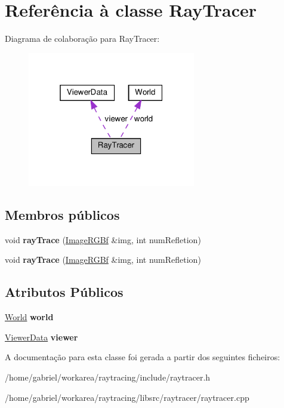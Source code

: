 \hypertarget{classRayTracer}{}\section{Referência à classe Ray\+Tracer}
\label{classRayTracer}


Diagrama de colaboração para Ray\+Tracer\+:
\nopagebreak
\begin{figure}[H]
\begin{center}
\leavevmode
\includegraphics[width=208pt]{classRayTracer__coll__graph}
\end{center}
\end{figure}
\subsection*{Membros públicos}
\begin{DoxyCompactItemize}
\item 
\mbox{\label{classRayTracer_aa4df800980bc0031eb6d15cf805feee9}} 
void {\bfseries ray\+Trace} (\hyperlink{classImageRGBf}{Image\+R\+G\+Bf} \&img, int num\+Refletion)
\item 
\mbox{\label{classRayTracer_aa4df800980bc0031eb6d15cf805feee9}} 
void {\bfseries ray\+Trace} (\hyperlink{classImageRGBf}{Image\+R\+G\+Bf} \&img, int num\+Refletion)
\end{DoxyCompactItemize}
\subsection*{Atributos Públicos}
\begin{DoxyCompactItemize}
\item 
\mbox{\label{classRayTracer_a2f48f14c213ea10dbd1fa4c804913f91}} 
\hyperlink{classWorld}{World} {\bfseries world}
\item 
\mbox{\label{classRayTracer_adf5b36f3b4e1e61ccb5afebba1e095b7}} 
\hyperlink{classViewerData}{Viewer\+Data} {\bfseries viewer}
\end{DoxyCompactItemize}


A documentação para esta classe foi gerada a partir dos seguintes ficheiros\+:\begin{DoxyCompactItemize}
\item 
/home/gabriel/workarea/raytracing/include/raytracer.\+h\item 
/home/gabriel/workarea/raytracing/libsrc/raytracer/raytracer.\+cpp\end{DoxyCompactItemize}

